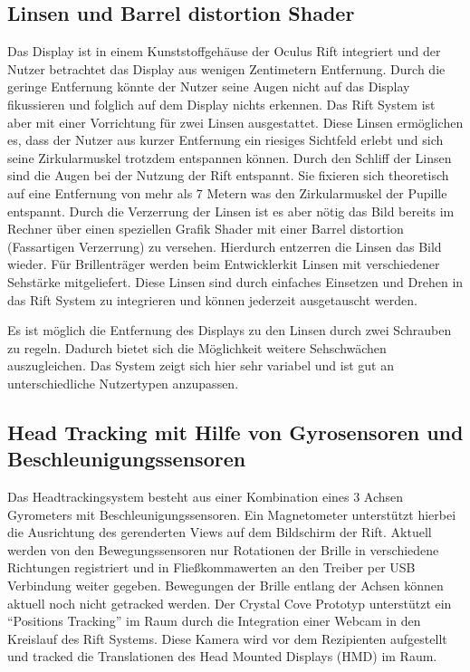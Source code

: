 \documentclass[pagesize, paper=a4, fontsize=12pt,titlepage=true, headings=small, headnosepline, abstractoff, liststotoc, nochapterprefix, plainheadsepline]{scrreprt}
\begin{document}
\subsection{Linsen und Barrel distortion Shader}
Das Display ist in einem Kunststoffgehäuse der Oculus Rift integriert und der Nutzer betrachtet das Display aus wenigen Zentimetern Entfernung. Durch die geringe Entfernung könnte der Nutzer seine Augen nicht auf das Display fikussieren und folglich auf dem Display nichts erkennen. Das Rift System ist aber mit einer Vorrichtung für zwei Linsen ausgestattet. Diese Linsen ermöglichen es, dass der Nutzer aus kurzer Entfernung ein riesiges Sichtfeld erlebt und sich seine Zirkularmuskel trotzdem entspannen können. Durch den Schliff der Linsen sind die Augen bei der Nutzung der Rift entspannt. Sie fixieren sich theoretisch auf eine Entfernung von mehr als 7 Metern was den Zirkularmuskel der Pupille entspannt. Durch die Verzerrung der Linsen ist es aber nötig das Bild bereits im Rechner über einen speziellen Grafik Shader mit einer Barrel distortion (Fassartigen Verzerrung) zu versehen. Hierdurch entzerren die Linsen das Bild wieder. Für Brillenträger werden beim Entwicklerkit Linsen mit verschiedener Sehstärke mitgeliefert. Diese Linsen sind durch einfaches Einsetzen und Drehen in das Rift System zu integrieren und können jederzeit ausgetauscht werden.

Es ist möglich die Entfernung des Displays zu den Linsen durch zwei Schrauben zu regeln. Dadurch bietet sich die Möglichkeit weitere Sehschwächen auszugleichen. Das System zeigt sich hier sehr variabel und ist gut an unterschiedliche Nutzertypen anzupassen.

\subsection{Head Tracking mit Hilfe von Gyrosensoren  und Beschleunigungssensoren}
Das Headtrackingsystem besteht aus einer Kombination eines 3 Achsen Gyrometers mit Beschleunigungssensoren. Ein Magnetometer unterstützt hierbei die Ausrichtung des gerenderten Views auf dem Bildschirm der Rift. Aktuell werden von den Bewegungssensoren nur Rotationen der Brille in verschiedene Richtungen registriert und in Fließkommawerten an den Treiber per USB Verbindung weiter gegeben. Bewegungen der Brille entlang der Achsen können aktuell noch nicht getracked werden. Der Crystal Cove Prototyp unterstützt ein "`Positions Tracking"' im Raum durch die Integration einer Webcam in den Kreislauf des Rift Systems. Diese Kamera wird vor dem Rezipienten aufgestellt und tracked die Translationen des Head Mounted Displays (HMD) im Raum.
\\
\end{document}
